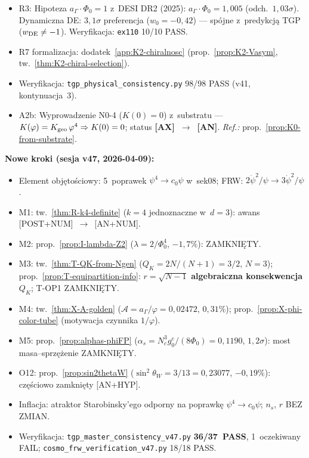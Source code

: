 \begin{itemize}[nosep]
  \item R3: Hipoteza $a_\Gamma \cdot \Phi_0 = 1$ z~DESI DR2 (2025):
        $a_\Gamma \cdot \Phi_0 = 1{,}005$ (odch.~$1{,}03\sigma$).
        Dynamiczna DE: $3{,}1\sigma$ preferencja ($w_0 = {-}0{,}42$)
        --- sp\'ojne z~predykcj\k{a} TGP ($w_{\rm DE} \neq {-}1$).
        Weryfikacja: \texttt{ex110} 10/10 PASS.
  \item R7 formalizacja: dodatek~\ref{app:K2-chiralnosc}
        (prop.~\ref{prop:K2-Vasym}, tw.~\ref{thm:K2-chiral-selection}).
  \item Weryfikacja: \texttt{tgp\_physical\_consistency.py}
        98/98 PASS (v41, kontynuacja~3).
  \item A2b: Wyprowadzenie N0-4 ($K(0) = 0$) z~substratu ---
        $K(\varphi) = K_{\rm geo}\,\varphi^4 \Rightarrow K(0) = 0$;
        status \textbf{[AX]~$\to$~[AN]}.
        \emph{Ref.:} prop.~\ref{prop:K0-from-substrate}.
\end{itemize}

\smallskip\noindent\textbf{Nowe kroki (sesja v47, 2026-04-09):}
\begin{itemize}[nosep]
  \item Element obj\k{e}to\'sciowy: 5~poprawek $\psi^4 \to c_0\psi$
        w~sek08; FRW: $2\dot\psi^2/\psi \to 3\dot\psi^2/\psi$.
  \item M1: tw.~\ref{thm:R-k4-definite} ($k{=}4$ jednoznaczne w~$d{=}3$):
        awans [POST+NUM]~$\to$~[AN+NUM].
  \item M2: prop.~\ref{prop:I-lambda-Z2}
        ($\lambda = 2/\Phi_0^4$, $-1{,}7\%$): ZAMKNI\k{E}TY.
  \item M3: tw.~\ref{thm:T-QK-from-Ngen}
        ($Q_K = 2N/(N{+}1) = 3/2$, $N{=}3$);
        prop.~\ref{prop:T-equipartition-info}: $r = \sqrt{N{-}1}$
        \textbf{algebraiczna konsekwencja} $Q_K$; T-OP1 ZAMKNI\k{E}TY.
  \item M4: tw.~\ref{thm:X-A-golden}
        ($\mathcal{A} = a_\Gamma/\varphi = 0{,}02472$, $0{,}31\%$);
        prop.~\ref{prop:X-phi-color-tube} (motywacja czynnika $1/\varphi$).
  \item M5: prop.~\ref{prop:alphas-phiFP}
        ($\alpha_s = N_c^3 g_0^e/(8\Phi_0) = 0{,}1190$, $1{,}2\sigma$):
        most masa--sprz\k{e}\.zenie ZAMKNI\k{E}TY.
  \item O12: prop.~\ref{prop:sin2thetaW}
        ($\sin^2\theta_W = 3/13 = 0{,}23077$, $-0{,}19\%$):
        cz\k{e}\'sciowo zamkni\k{e}ty [AN+HYP].
  \item Inflacja: atraktor Starobinsky'ego odporny na poprawk\k{e}
        $\psi^4 \to c_0\psi$; $n_s$, $r$ BEZ ZMIAN.
  \item Weryfikacja: \texttt{tgp\_master\_consistency\_v47.py}
        \textbf{36/37~PASS}, 1~oczekiwany FAIL;
        \texttt{cosmo\_frw\_verification\_v47.py} 18/18 PASS.
\end{itemize}

